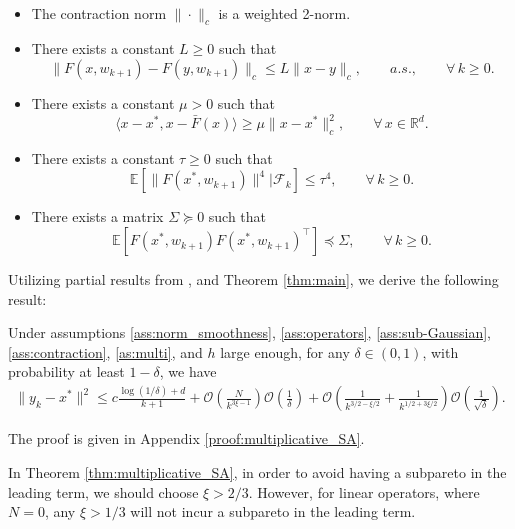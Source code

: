 \documentclass[letterpaper, 10 pt]{article}
\newcommand{\E}{\mathbb{E}}
\begin{document}
\begin{assumption}\label{as:multi}$ $
\begin{itemize}
    \item[(i)] The contraction norm $\|\cdot\|_c$ is a weighted 2-norm.
    \item[(ii)] There exists a constant $L\geq 0$ such that
    \[ \|F(x,w_{k+1})-F(y,w_{k+1})\|_c\leq L\|x-y\|_c, \qquad a.s., \qquad \forall \, k \geq 0. \]
    \item[(iii)] There exists a constant $\mu>0$ such that
    \[ \langle x-x^*,x-\bar{F}(x) \rangle \geq \mu \|x-x^*\|_c^2, \qquad \forall\,x\in\mathbb{R}^d.  \]
    \item[(iv)] There exists a constant $\tau\geq 0$ such that
    \[ \E[\|F(x^*,w_{k+1})\|^4 |\mathcal{F}_k]\leq \tau^4, \qquad \forall\, k \geq 0. \]
    \item[(v)] There exists a matrix $\Sigma\succeq 0$ such that
    \[ \E[F(x^*,w_{k+1})F(x^*,w_{k+1})^\top]\preceq\Sigma, \qquad \forall\, k\geq 0. \]
\end{itemize}
\end{assumption}

Utilizing partial results from \cite[Theorem 3]{moulines2011non}, and Theorem \ref{thm:main}, we derive the following result:
\begin{theorem}\label{thm:multiplicative_SA}
    Under assumptions \ref{ass:norm_smoothness}, \ref{ass:operators}, \ref{ass:sub-Gaussian}, \ref{ass:contraction}, \ref{as:multi}, and $h$ large enough, for any $\delta\in(0,1)$, with probability at least $1-\delta$, we have
    \begin{align*}
        \|y_k-x^*\|^2\leq c\frac{\log(1/\delta)+d}{k+1} + \mathcal{O}\left(\frac{N}{k^{3\xi-1}}\right)\mathcal{O}\left(\frac{1}{\delta}\right)+\mathcal{O}\left(\frac{1}{k^{3/2-\xi/2}}+\frac{1}{k^{1/2+3\xi/2}}\right) \mathcal{O}\left(\frac{1}{\sqrt{\delta}}\right).
    \end{align*}
\end{theorem}
The proof is given in Appendix \ref{proof:multiplicative_SA}.\\

\begin{remark}
    In Theorem \ref{thm:multiplicative_SA}, in order to avoid having a subpareto in the leading term, we should choose $\xi>2/3$. However, for linear operators, where $N=0$, any $\xi>1/3$ will not incur a subpareto in the leading term.
\end{remark}
\end{document}
